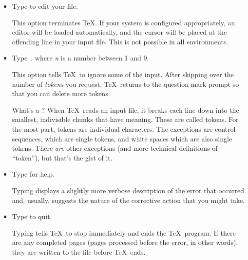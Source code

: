 \begin{itemize}
\newpage
\item{Type  to edit your file.}

This option terminates \TeX.  If your system is configured appropriately,
an editor will be loaded automatically, and the cursor will be placed
at the offending line in your input file.  This is not possible in
all environments.  

\item{Type \,, where {\em n} is a number between 1 and 9.}

This option tells \TeX\ to ignore some of the input.  After skipping
over the number of \textit{tokens} you request, \TeX\ returns to the
question mark prompt so that you can delete more tokens.  

What's a ?  When \TeX\ reads an input file, it breaks each
line down into the smallest, indivisible chunks that have meaning.
These are called tokens.  For the most part, tokens are individual characters.
The exceptions are control sequences, which are single tokens, and white
spaces which are also single tokens.  There {\em are\/} other exceptions
(and more technical definitions of ``token''), but that's the gist of it.

\item{Type  for help.}

Typing  displays a slightly more verbose description of the error
that occurred and, usually, suggests the nature of the corrective action
that you might take.

\item{Type  to quit.}

Typing  tells \TeX\ to stop immediately and ends the \TeX\ program.
If there are any completed pages (pages processed before the error,
in other words), they are written to the  file before \TeX\
ends.

\end{itemize}


